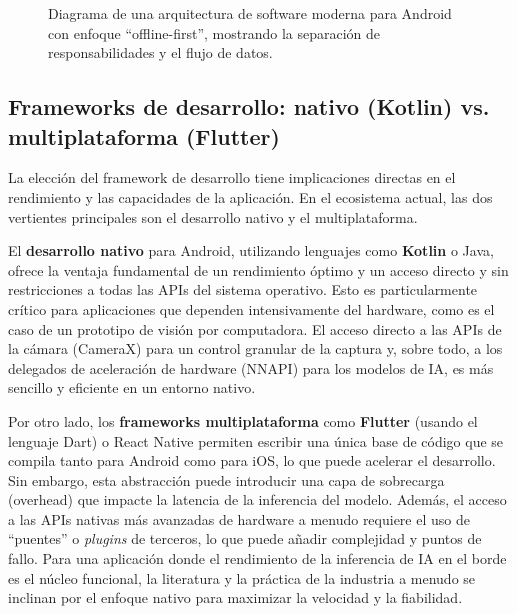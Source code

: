 \begin{figure}[H]
    \centering
    \caption{Diagrama de una arquitectura de software moderna para Android con enfoque ``offline-first'', mostrando la separación de responsabilidades y el flujo de datos.}
    \label{fig:offline_architecture}
\end{figure}


\subsection{Frameworks de desarrollo: nativo (Kotlin) vs. multiplataforma (Flutter)}
\label{ssec:development_frameworks}

La elección del framework de desarrollo tiene implicaciones directas en el rendimiento y las capacidades de la aplicación. En el ecosistema actual, las dos vertientes principales son el desarrollo nativo y el multiplataforma.

El \textbf{desarrollo nativo} para Android, utilizando lenguajes como \textbf{Kotlin} o Java, ofrece la ventaja fundamental de un rendimiento óptimo y un acceso directo y sin restricciones a todas las APIs del sistema operativo. Esto es particularmente crítico para aplicaciones que dependen intensivamente del hardware, como es el caso de un prototipo de visión por computadora. El acceso directo a las APIs de la cámara (CameraX) para un control granular de la captura y, sobre todo, a los delegados de aceleración de hardware (NNAPI) para los modelos de IA, es más sencillo y eficiente en un entorno nativo.

Por otro lado, los \textbf{frameworks multiplataforma} como \textbf{Flutter} (usando el lenguaje Dart) o React Native permiten escribir una única base de código que se compila tanto para Android como para iOS, lo que puede acelerar el desarrollo. Sin embargo, esta abstracción puede introducir una capa de sobrecarga (overhead) que impacte la latencia de la inferencia del modelo. Además, el acceso a las APIs nativas más avanzadas de hardware a menudo requiere el uso de ``puentes'' o \textit{plugins} de terceros, lo que puede añadir complejidad y puntos de fallo. Para una aplicación donde el rendimiento de la inferencia de IA en el borde es el núcleo funcional, la literatura y la práctica de la industria a menudo se inclinan por el enfoque nativo para maximizar la velocidad y la fiabilidad.

